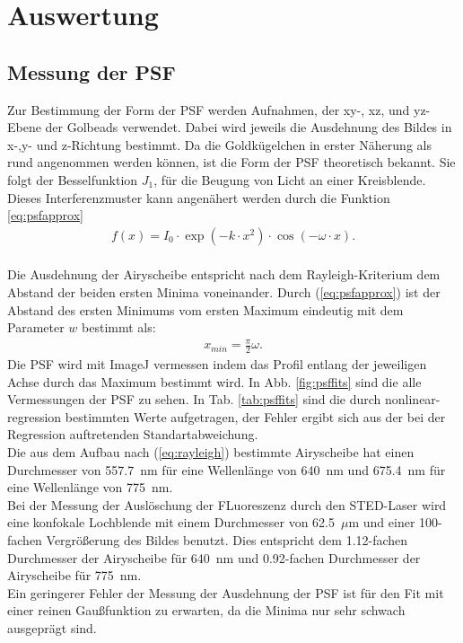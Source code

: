 \section{Auswertung}
\subsection{Messung der PSF}
Zur Bestimmung der Form der PSF werden Aufnahmen, der xy-, xz, und yz-Ebene der Golbeads verwendet. 
Dabei wird jeweils die Ausdehnung des Bildes in x-,y- und z-Richtung bestimmt.
Da die Goldkügelchen in erster Näherung als rund angenommen werden können, ist die Form der PSF theoretisch bekannt.
Sie folgt der Besselfunktion $J_1$, für die Beugung von Licht an einer Kreisblende.
Dieses Interferenzmuster kann angenähert werden durch die Funktion \ref{eq:psfapprox}
\begin{align}
	f(x)=I_0 \cdot \exp \left( -k \cdot x^2 \right) \cdot \cos \left(-\omega\cdot x\right). \label{eq:psfapprox}
\end{align}
\\ 
Die Ausdehnung der Airyscheibe entspricht nach dem Rayleigh-Kriterium dem Abstand der beiden ersten Minima voneinander. 
Durch (\ref{eq:psfapprox}) ist der Abstand des ersten Minimums vom ersten Maximum eindeutig mit dem Parameter $w$ bestimmt als:
\begin{align}
x_{min} = \frac{\pi}{2}\omega.
\end{align}
Die PSF wird mit ImageJ vermessen indem das Profil entlang der jeweiligen Achse durch das Maximum bestimmt wird.
In Abb. \ref{fig:psffits} sind die alle Vermessungen der PSF zu sehen. In Tab. \ref{tab:psffits} sind die durch nonlinear-regression bestimmten Werte aufgetragen, der Fehler ergibt sich aus der bei der Regression auftretenden Standartabweichung.
\\
Die aus dem Aufbau nach (\ref{eq:rayleigh}) bestimmte Airyscheibe hat einen Durchmesser von 557.7~nm für eine Wellenlänge von 640~nm und 675.4~nm für eine Wellenlänge von 775~nm.
\\
Bei der Messung der Auslöschung der FLuoreszenz durch den STED-Laser wird eine konfokale Lochblende mit einem Durchmesser von 62.5~$\mu$m und einer 100-fachen Vergrößerung des Bildes benutzt. 
Dies entspricht dem 1.12-fachen Durchmesser der Airyscheibe für 640~nm und 0.92-fachen Durchmesser der Airyscheibe für 775~nm.
\\ 
Ein geringerer Fehler der Messung der Ausdehnung der PSF ist für den Fit mit einer reinen Gaußfunktion zu erwarten, da die Minima nur sehr schwach ausgeprägt sind. 
